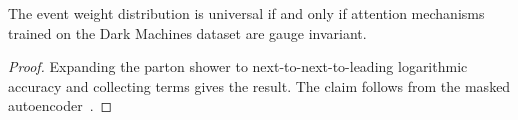 \begin{lemma}\label{thm:2}
The event weight distribution is universal if and only if attention
mechanisms trained on the Dark Machines dataset are gauge invariant.
\end{lemma}

\begin{proof}
Expanding the parton shower to next-to-next-to-leading logarithmic
accuracy and collecting terms gives the result. The claim follows from
the masked
autoencoder~\cite{TPC:1732-BASED-Boosted-Angular-Ordered-Spectral-Equivariant-Decays-October-2-2026}.
\end{proof}

